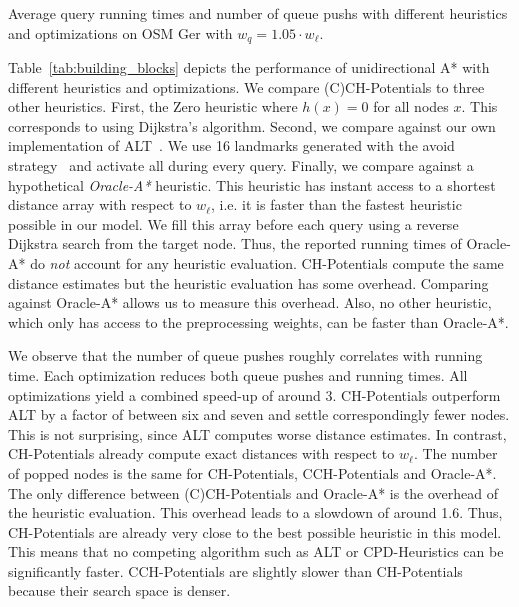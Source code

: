 \documentclass[manuscript,review]{acmart}
\begin{document}
\begin{table}
\centering
\caption{Average query running times and number of queue pushs with different heuristics and optimizations on OSM Ger with $w_q = 1.05 \cdot w_\ell$.}\label{tab:building_blocks}

\end{table}

Table~\ref{tab:building_blocks} depicts the performance of unidirectional A* with different heuristics and optimizations.
We compare (C)CH-Potentials to three other heuristics.
First, the Zero heuristic where $h(x)=0$ for all nodes $x$.
This corresponds to using Dijkstra's algorithm.
Second, we compare against our own implementation of ALT~\cite{gw-cppsp-05}.
We use 16 landmarks generated with the avoid strategy~\cite{gw-cppsp-05} and activate all during every query.
Finally, we compare against a hypothetical \emph{Oracle-A*} heuristic.
This heuristic has instant access to a shortest distance array with respect to $w_\ell$, i.e. it is faster than the fastest heuristic possible in our model.
We fill this array before each query using a reverse Dijkstra search from the target node.
Thus, the reported running times of Oracle-A* do \emph{not} account for any heuristic evaluation.
CH-Potentials compute the same distance estimates but the heuristic evaluation has some overhead.
Comparing against Oracle-A* allows us to measure this overhead.
Also, no other heuristic, which only has access to the preprocessing weights, can be faster than Oracle-A*.

We observe that the number of queue pushes roughly correlates with running time.
Each optimization reduces both queue pushes and running times.
All optimizations yield a combined speed-up of around 3.
CH-Potentials outperform ALT by a factor of between six and seven and settle correspondingly fewer nodes.
This is not surprising, since ALT computes worse distance estimates.
In contrast, CH-Potentials already compute exact distances with respect to $w_\ell$.
The number of popped nodes is the same for CH-Potentials, CCH-Potentials and Oracle-A*.
The only difference between (C)CH-Potentials and Oracle-A* is the overhead of the heuristic evaluation.
This overhead leads to a slowdown of around 1.6.
Thus, CH-Potentials are already very close to the best possible heuristic in this model.
This means that no competing algorithm such as ALT or CPD-Heuristics can be significantly faster.
CCH-Potentials are slightly slower than CH-Potentials because their search space is denser.
\end{document}
